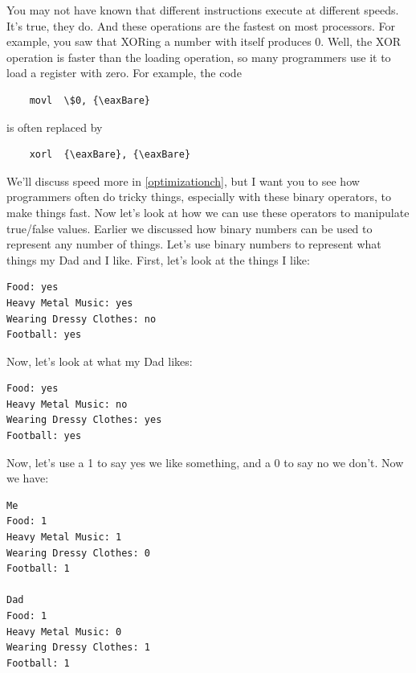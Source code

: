You may not have known that different instructions execute at different
speeds.  It's true, they do.  And these operations are the
fastest on most processors.  For example, you saw that XORing a number with 
itself produces 0.  Well, the XOR operation is faster than the loading operation, so
many programmers use it to load a register with zero.  For example, the
code

\begin{simpletyping}
\begin{lstlisting}
	movl  \$0, {\eaxBare}
\end{lstlisting}
\end{simpletyping}

is often replaced by

\begin{simpletyping}
\begin{lstlisting}
	xorl  {\eaxBare}, {\eaxBare}
\end{lstlisting}
\end{simpletyping}

We'll discuss speed more in \autoref{optimizationch}, but I want you
to see how programmers often do tricky things, especially with these
binary operators, to make things fast.  Now let's look at how we
can use these operators to manipulate true/false values.  Earlier
we discussed how binary numbers can be used to represent any number
of things.  Let's use binary numbers to represent what things my
Dad and I like.  First, let's look at the things I like:

\begin{simpletyping}
\begin{lstlisting}
Food: yes
Heavy Metal Music: yes
Wearing Dressy Clothes: no
Football: yes
\end{lstlisting}
\end{simpletyping}

Now, let's look at what my Dad likes:

\begin{simpletyping}
\begin{lstlisting}
Food: yes
Heavy Metal Music: no
Wearing Dressy Clothes: yes
Football: yes
\end{lstlisting}
\end{simpletyping}

Now, let's use a 1 to say yes we like something, and a 0 to say no we don't.
Now we have:

\begin{simpletyping}
\begin{lstlisting}
Me
Food: 1
Heavy Metal Music: 1
Wearing Dressy Clothes: 0
Football: 1

Dad
Food: 1
Heavy Metal Music: 0
Wearing Dressy Clothes: 1
Football: 1
\end{lstlisting}
\end{simpletyping}


